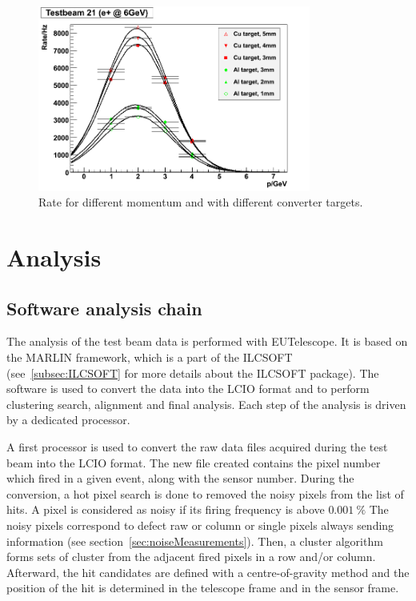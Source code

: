     \begin{figure}[!h]
      \centering
      \includegraphics[width = 0.8\textwidth]{Pictures/X0/rate_vs_p_t21.png}
      \caption{Rate for different momentum and with different converter targets\cite{DESYII}.}
      \label{fig:rateTB21}
    \end{figure}


  \section{Analysis}
  \label{sec:X0}

   \subsection{Software analysis chain}

    The analysis of the test beam data is performed with EUTelescope\cite{Eutel}\cite{Jansen}.
    It is based on the MARLIN framework, which is a part of the ILCSOFT (see~\ref{subsec:ILCSOFT} for more details about the ILCSOFT package).
    The software is used to convert the data into the LCIO format and to perform clustering search, alignment and final analysis.
    Each step of the analysis is driven by a dedicated processor.

    A first processor is used to convert the raw data files acquired during the test beam into the LCIO format.
    The new file created contains the pixel number which fired in a given event, along with the sensor number.
    During the conversion, a hot pixel search is done to removed the noisy pixels from the list of hits.
    A pixel is considered as noisy if its firing frequency is above $0.001~\%$
    The noisy pixels correspond to defect raw or column or single pixels always sending information (see section~\ref{sec:noiseMeasurements}).
    Then, a cluster algorithm forms sets of cluster from the adjacent fired pixels in a row and/or column.
    Afterward, the hit candidates are defined with a centre-of-gravity method and the position of the hit is determined in the telescope frame and in the sensor frame.

